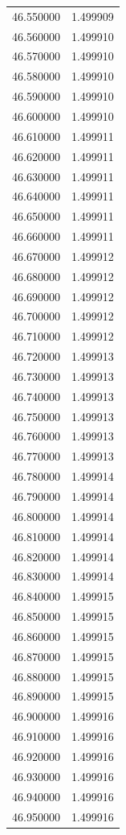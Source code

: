 \begin{tabular}{rr}
46.550000 & 1.499909 \\
46.560000 & 1.499910 \\
46.570000 & 1.499910 \\
46.580000 & 1.499910 \\
46.590000 & 1.499910 \\
46.600000 & 1.499910 \\
46.610000 & 1.499911 \\
46.620000 & 1.499911 \\
46.630000 & 1.499911 \\
46.640000 & 1.499911 \\
46.650000 & 1.499911 \\
46.660000 & 1.499911 \\
46.670000 & 1.499912 \\
46.680000 & 1.499912 \\
46.690000 & 1.499912 \\
46.700000 & 1.499912 \\
46.710000 & 1.499912 \\
46.720000 & 1.499913 \\
46.730000 & 1.499913 \\
46.740000 & 1.499913 \\
46.750000 & 1.499913 \\
46.760000 & 1.499913 \\
46.770000 & 1.499913 \\
46.780000 & 1.499914 \\
46.790000 & 1.499914 \\
46.800000 & 1.499914 \\
46.810000 & 1.499914 \\
46.820000 & 1.499914 \\
46.830000 & 1.499914 \\
46.840000 & 1.499915 \\
46.850000 & 1.499915 \\
46.860000 & 1.499915 \\
46.870000 & 1.499915 \\
46.880000 & 1.499915 \\
46.890000 & 1.499915 \\
46.900000 & 1.499916 \\
46.910000 & 1.499916 \\
46.920000 & 1.499916 \\
46.930000 & 1.499916 \\
46.940000 & 1.499916 \\
46.950000 & 1.499916 \\

\end{tabular}
